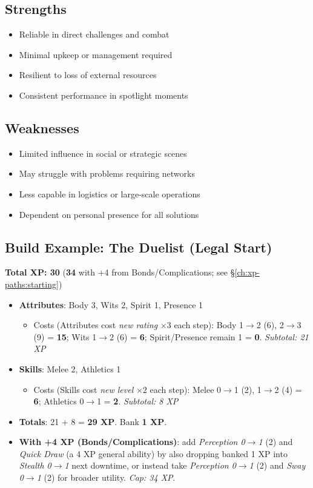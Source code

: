 \begin{multicols}{2}
\subsection*{Strengths}
\begin{itemize}
\item Reliable in direct challenges and combat
\item Minimal upkeep or management required
\item Resilient to loss of external resources
\item Consistent performance in spotlight moments
\end{itemize}

\subsection*{Weaknesses}
\begin{itemize}
\item Limited influence in social or strategic scenes
\item May struggle with problems requiring networks
\item Less capable in logistics or large-scale operations
\item Dependent on personal presence for all solutions
\end{itemize}

\subsection*{Build Example: The Duelist (Legal Start)}
\textbf{Total XP: 30} \quad (\textbf{34} with +4 from Bonds/Complications; see \S\ref{ch:xp-paths:starting})
\begin{itemize}
\item \textbf{Attributes}: Body 3, Wits 2, Spirit 1, Presence 1
  \begin{itemize}
  \item Costs (Attributes cost \emph{new rating} $\times 3$ each step): Body 1$\to$2 (6), 2$\to$3 (9) = \textbf{15}; Wits 1$\to$2 (6) = \textbf{6}; Spirit/Presence remain 1 = \textbf{0}. \emph{Subtotal: 21 XP}
  \end{itemize}
\item \textbf{Skills}: Melee 2, Athletics 1
  \begin{itemize}
  \item Costs (Skills cost \emph{new level} $\times 2$ each step): Melee 0$\to$1 (2), 1$\to$2 (4) = \textbf{6}; Athletics 0$\to$1 = \textbf{2}. \emph{Subtotal: 8 XP}
  \end{itemize}
\item \textbf{Totals}: 21 + 8 = \textbf{29 XP}. Bank \textbf{1 XP}.
\item \textbf{With +4 XP (Bonds/Complications)}: add \emph{Perception 0$\to$1} (2) and \emph{Quick Draw} (a 4 XP general ability) by also dropping banked 1 XP into \emph{Stealth 0$\to$1} next downtime, or instead take \emph{Perception 0$\to$1} (2) and \emph{Sway 0$\to$1} (2) for broader utility. \emph{Cap: 34 XP}.
\end{itemize}


\end{multicols}
